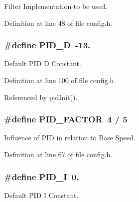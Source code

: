Filter Implementation to be used. 



Definition at line 48 of file config.\-h.

\hypertarget{group__config_ga2a442b8579a5c5f9526e824165125497}{
\subsubsection[{P\-I\-D\-\_\-\-D}]{\setlength{\rightskip}{0pt plus 5cm}\#define P\-I\-D\-\_\-\-D~-\/13.}}\label{group__config_ga2a442b8579a5c5f9526e824165125497}


Default P\-I\-D D Constant. 



Definition at line 100 of file config.\-h.



Referenced by pid\-Init().

\hypertarget{group__config_ga0eb032986beceb6759aebd761c35a879}{
\subsubsection[{P\-I\-D\-\_\-\-F\-A\-C\-T\-O\-R}]{\setlength{\rightskip}{0pt plus 5cm}\#define P\-I\-D\-\_\-\-F\-A\-C\-T\-O\-R~4 / 5}}\label{group__config_ga0eb032986beceb6759aebd761c35a879}


Influence of P\-I\-D in relation to Base Speed. 



Definition at line 67 of file config.\-h.

\hypertarget{group__config_ga2dfd5fcf8dd0bee1de9007fe8e161886}{
\subsubsection[{P\-I\-D\-\_\-\-I}]{\setlength{\rightskip}{0pt plus 5cm}\#define P\-I\-D\-\_\-\-I~0.}}\label{group__config_ga2dfd5fcf8dd0bee1de9007fe8e161886}


Default P\-I\-D I Constant. 



